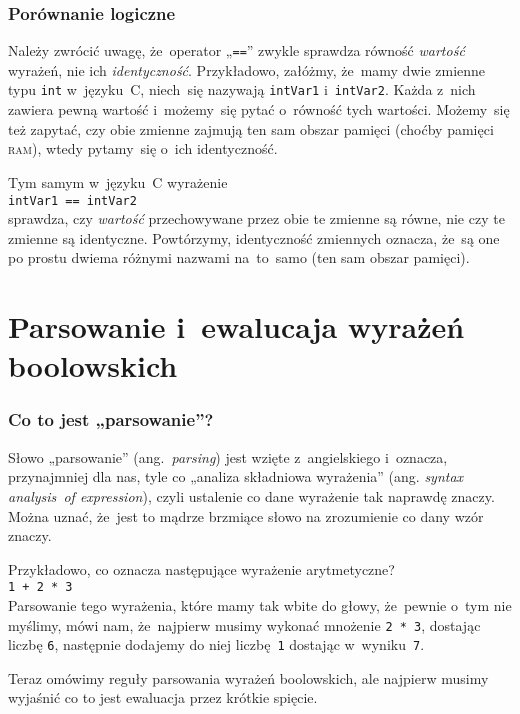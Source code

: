 \documentclass[10pt,t]{beamer}
\begin{document}
\begin{frame}
  \frametitle{Porównanie logiczne}


  Należy zwrócić uwagę, że~operator „\texttt{==}” zwykle sprawdza równość
  \textit{wartość} wyrażeń, nie ich \textit{identyczność}. Przykładowo,
  załóżmy, że~mamy dwie zmienne typu \texttt{int} w~języku~C, niech~się
  nazywają \texttt{intVar1} i~\texttt{intVar2}. Każda z~nich zawiera pewną
  wartość i~możemy~się pytać o~równość tych wartości. Możemy~się też
  zapytać, czy obie zmienne zajmują ten sam obszar pamięci (choćby pamięci
  \textsc{ram}), wtedy pytamy~się o~ich identyczność.

  Tym samym w~języku~C wyrażenie \\
  \texttt{intVar1 == intVar2} \\
  sprawdza, czy \textit{wartość} przechowywane przez obie te
  zmienne są równe, nie czy te zmienne są identyczne. Powtórzymy,
  identyczność zmiennych oznacza, że~są one po prostu dwiema różnymi
  nazwami na~to~samo (ten sam obszar pamięci).

\end{frame}










\section{Parsowanie i~ewalucaja wyrażeń boolowskich}



\begin{frame}
  \frametitle{Co to jest „parsowanie”?}


  Słowo „parsowanie” (ang.~\textit{parsing}) jest wzięte z~angielskiego
  i~oznacza, przynajmniej dla nas, tyle co „analiza składniowa wyrażenia”
  (ang. \textit{syntax analysis~of expression}), czyli ustalenie co dane
  wyrażenie tak naprawdę znaczy. Można uznać, że~jest to mądrze brzmiące
  słowo na zrozumienie co dany wzór znaczy.

  Przykładowo, co oznacza następujące wyrażenie arytmetyczne? \\
  \texttt{1 + 2 * 3} \\
  Parsowanie tego wyrażenia, które mamy tak wbite do głowy, że~pewnie o~tym
  nie myślimy, mówi nam, że~najpierw musimy wykonać mnożenie
  \texttt{2 * 3}, dostając liczbę \texttt{6}, następnie dodajemy do
  niej liczbę~\texttt{1} dostając w~wyniku~\texttt{7}.

  Teraz omówimy reguły parsowania wyrażeń boolowskich, ale najpierw musimy
  wyjaśnić co to jest ewaluacja przez krótkie spięcie.

\end{frame}
\end{document}
